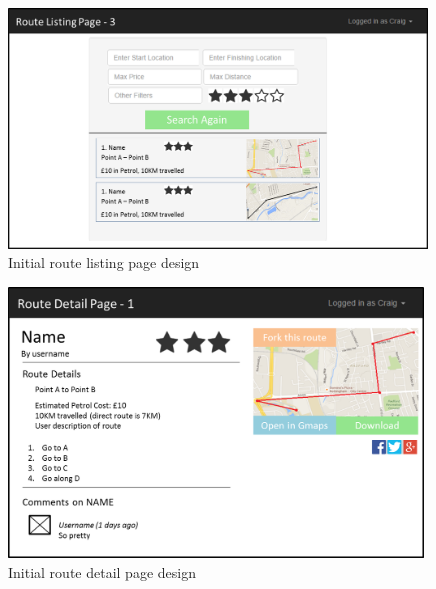 \documentclass[a4paper,twoside,notitlepage,11pt]{article}
\begin{document}
\begin{figure}[!ht]
	\begin{center}
			\includegraphics[width=0.99\textwidth]{images/ui-rlp-3.png}
	\end{center}
	\vspace{-6mm}
	\caption{Initial route listing page design}
\end{figure}

\begin{figure}[!ht]
	\begin{center}
			\includegraphics[width=0.98\textwidth]{images/ui-detail-1.png}
	\end{center}
	\vspace{-6mm}
	\caption{Initial route detail page design}
\end{figure}
\end{document}
